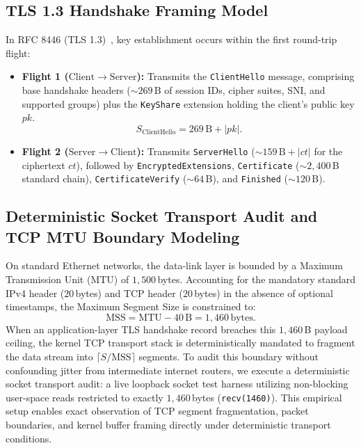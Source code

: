\documentclass[10pt,twocolumn,a4paper]{article}
\begin{document}
\subsection{TLS 1.3 Handshake Framing Model}
In RFC 8446 (TLS 1.3)~\cite{rescorla2018}, key establishment occurs within the first round-trip flight:
\begin{itemize}
    \item \textbf{Flight 1 ($\mathrm{Client} \to \mathrm{Server}$):} Transmits the \texttt{ClientHello} message, comprising base handshake headers ($\sim 269\,$B of session IDs, cipher suites, SNI, and supported groups) plus the \texttt{KeyShare} extension holding the client's public key $pk$.
    \begin{equation}
    S_{\mathrm{ClientHello}} = 269\,\mathrm{B} + |pk|.
    \end{equation}
    \item \textbf{Flight 2 ($\mathrm{Server} \to \mathrm{Client}$):} Transmits \texttt{ServerHello} ($\sim 159\,\mathrm{B} + |ct|$ for the ciphertext $ct$), followed by \texttt{EncryptedExtensions}, \texttt{Certificate} ($\sim 2{,}400\,$B standard chain), \texttt{CertificateVerify} ($\sim 64\,$B), and \texttt{Finished} ($\sim 120\,$B).
\end{itemize}

\subsection{Deterministic Socket Transport Audit and TCP MTU Boundary Modeling}
On standard Ethernet networks, the data-link layer is bounded by a Maximum Transmission Unit (MTU) of $1{,}500\,$bytes. Accounting for the mandatory standard IPv4 header ($20\,$bytes) and TCP header ($20\,$bytes) in the absence of optional timestamps, the Maximum Segment Size is constrained to:
\begin{equation}
\mathrm{MSS} = \mathrm{MTU} - 40\,\mathrm{B} = 1{,}460\,\mathrm{bytes}.
\end{equation}
When an application-layer TLS handshake record breaches this $1{,}460\,$B payload ceiling, the kernel TCP transport stack is deterministically mandated to fragment the data stream into $\lceil S / \mathrm{MSS} \rceil$ segments. To audit this boundary without confounding jitter from intermediate internet routers, we execute a deterministic socket transport audit: a live loopback socket test harness utilizing non-blocking user-space reads restricted to exactly $1{,}460\,$bytes (\texttt{recv(1460)}). This empirical setup enables exact observation of TCP segment fragmentation, packet boundaries, and kernel buffer framing directly under deterministic transport conditions.
\end{document}
